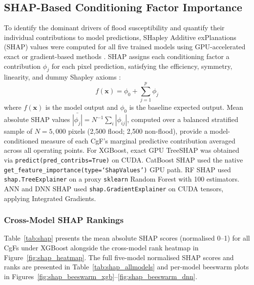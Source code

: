 \documentclass[12pt, a4paper]{article}
\begin{document}
\subsection{SHAP-Based Conditioning Factor Importance}
\label{sec:shap}

To identify the dominant drivers of flood susceptibility and quantify their individual contributions to model predictions, SHapley Additive exPlanations (SHAP) values were computed for all five trained models using GPU-accelerated exact or gradient-based methods \citep{lundberg2017, lundberg2020}.  SHAP assigns each conditioning factor a contribution $\phi_j$ for each pixel prediction, satisfying the efficiency, symmetry, linearity, and dummy Shapley axioms \citep{shapley1953}:
\begin{equation}
  f(\mathbf{x}) = \phi_0 + \sum_{j=1}^{p} \phi_j
  \label{eq:shap}
\end{equation}
where $f(\mathbf{x})$ is the model output and $\phi_0$ is the baseline expected output.  Mean absolute SHAP values $\bar{|\phi_j|} = N^{-1}\sum_i |\phi_{ij}|$, computed over a balanced stratified sample of $N = 5{,}000$ pixels (2,500 flood; 2,500 non-flood), provide a model-conditioned measure of each CgF's marginal predictive contribution averaged across all operating points.  For XGBoost, exact GPU TreeSHAP was obtained via \texttt{predict(pred\_contribs=True)} on CUDA. CatBoost SHAP used the native \texttt{get\_feature\_importance(type=`ShapValues')} GPU path. RF SHAP used \texttt{shap.TreeExplainer} on a proxy \texttt{sklearn} Random Forest with 100 estimators. ANN and DNN SHAP used \texttt{shap.GradientExplainer} on CUDA tensors, applying Integrated Gradients.

\subsubsection{Cross-Model SHAP Rankings}

Table~\ref{tab:shap} presents the mean absolute SHAP scores (normalised 0--1) for all CgFs under XGBoost alongside the cross-model rank heatmap in Figure~\ref{fig:shap_heatmap}. The full five-model normalised SHAP scores and ranks are presented in Table~\ref{tab:shap_allmodels} and per-model beeswarm plots in Figures~\ref{fig:shap_beeswarm_xgb}--\ref{fig:shap_beeswarm_dnn}.
\end{document}
